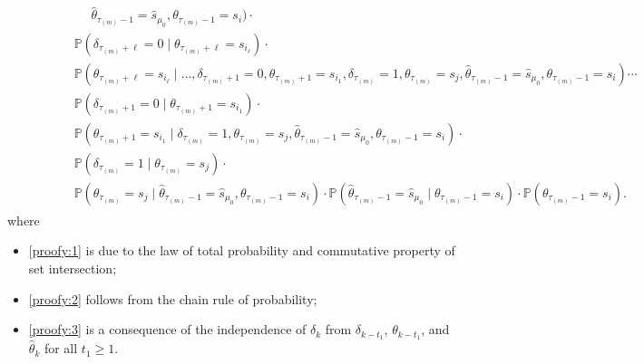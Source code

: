 \documentclass[journal,twoside,web]{ieeecolor}
\begin{document}
\begin{figure*}[ht]
\begin{align}
\begin{aligned}
& \qquad\qquad\quad\! \hat{\theta}_{\tau_{(m)}-1} = \hat{s}_{\mu_{0}},\theta_{\tau_{(m)}-1}=s_i)\cdot \\
& \qquad\quad~~~\! \mathbb{P}(\delta_{\tau_{(m)}+\ell}=0 \mid \theta_{\tau_{(m)}+\ell}=s_{i_{\ell}})\cdot \\
& \qquad\quad~~~\!
\mathbb{P}(\theta_{\tau_{(m)}+\ell}=s_{i_{\ell}}\mid\dots,\delta_{\tau_{(m)}+1}=0,\theta_{\tau_{(m)}+1}=s_{i_{1}},\delta_{\tau_{(m)}}=1,\theta_{\tau_{(m)}}=s_j, \hat{\theta}_{\tau_{(m)}-1} = \hat{s}_{\mu_{0}},\theta_{\tau_{(m)}-1}=s_i)\cdots \\
& \qquad\quad~~~\!
\mathbb{P}(\delta_{\tau_{(m)}+1}=0 \mid \theta_{\tau_{(m)}+1}=s_{i_{1}})\cdot \\
& \qquad\quad~~~\!
\mathbb{P}(\theta_{\tau_{(m)}+1}=s_{i_{1}} \mid \delta_{\tau_{(m)}}=1,\theta_{\tau_{(m)}}=s_j, \hat{\theta}_{\tau_{(m)}-1} = \hat{s}_{\mu_{0}},\theta_{\tau_{(m)}-1}=s_i)\cdot \\
& \qquad\quad~~~\!
\mathbb{P}(\delta_{\tau_{(m)}}=1 \mid \theta_{\tau_{(m)}}=s_j)\cdot \\
& \qquad\quad~~~\!
\mathbb{P}(\theta_{\tau_{(m)}}=s_j \mid \hat{\theta}_{\tau_{(m)}-1} = \hat{s}_{\mu_{0}},\theta_{\tau_{(m)}-1}=s_i)\cdot 
\mathbb{P}(\hat{\theta}_{\tau_{(m)}-1} = \hat{s}_{\mu_{0}}\mid\theta_{\tau_{(m)}-1}=s_i) \cdot 
\mathbb{P}(\theta_{\tau_{(m)}-1}=s_i).
\end{aligned}
\end{align}
where 
\begin{itemize}
    \item \eqref{proofy:1} is due to the law of total probability and commutative property of set intersection;
    \item \eqref{proofy:2} follows from the chain rule of probability;
    \item \eqref{proofy:3} is a consequence of the independence of $\delta_{k}$ from $\delta_{k-t_{1}}$, $\theta_{k-t_{1}}$, and $\hat{\theta}_{k}$ for all $t_{1}\geq 1$.
\end{itemize}
\end{figure*}
\end{document}
